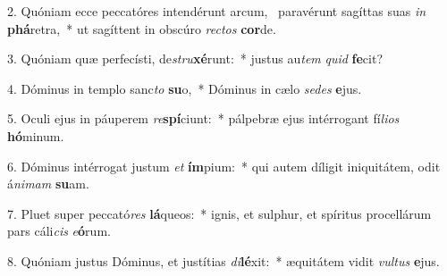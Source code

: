 2. Quóniam ecce peccatóres intendérunt arcum, \dag\  paravérunt sagíttas suas \textit{in} \textbf{phá}retra,~*  ut sagíttent in obscúro \textit{rec}\textit{tos} \textbf{cor}de.\

3. Quóniam quæ perfecísti, de\textit{stru}\textbf{xé}runt:~*  justus au\textit{tem} \textit{quid} \textbf{fe}cit?\

4. Dóminus in templo sanc\textit{to} \textbf{su}o,~*  Dóminus in cælo \textit{se}\textit{des} \textbf{e}jus.\

5. Oculi ejus in páuperem \textit{re}\textbf{spí}ciunt:~*  pálpebræ ejus intérrogant fí\textit{li}\textit{os} \textbf{hó}minum.\

6. Dóminus intérrogat justum \textit{et} \textbf{ím}pium:~*  qui autem díligit iniquitátem, odit á\textit{ni}\textit{mam} \textbf{su}am.\

7. Pluet super peccató\textit{res} \textbf{lá}queos:~*  ignis, et sulphur, et spíritus procellárum pars cáli\textit{cis} \textit{e}\textbf{ó}rum.\

8. Quóniam justus Dóminus, et justítias \textit{di}\textbf{lé}xit:~*  æquitátem vidit \textit{vul}\textit{tus} \textbf{e}jus.\


